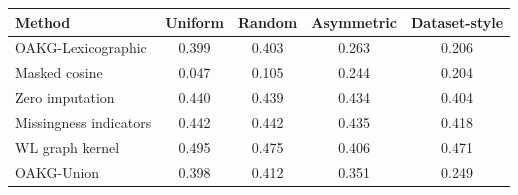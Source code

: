 \begin{tabular}{lcccc}
\toprule
Method & Uniform & Random & Asymmetric & Dataset-style \\
\midrule
OAKG-Lexicographic & 0.399 & 0.403 & 0.263 & 0.206 \\
Masked cosine & 0.047 & 0.105 & 0.244 & 0.204 \\
Zero imputation & 0.440 & 0.439 & 0.434 & 0.404 \\
Missingness indicators & 0.442 & 0.442 & 0.435 & 0.418 \\
WL graph kernel & 0.495 & 0.475 & 0.406 & 0.471 \\
OAKG-Union & 0.398 & 0.412 & 0.351 & 0.249 \\
\bottomrule
\end{tabular}
